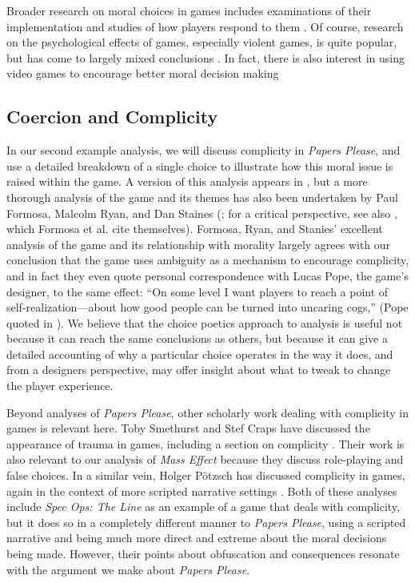\documentclass[arts,article,submit,moreauthors,pdftex,10pt,a4paper]{Definitions/mdpi}
\begin{document}
Broader research on moral choices in games includes examinations of their implementation and studies of how players respond to them \citep{svelch2010good,weaver2012mirrored,consalvo2016playing}.
%
Of course, research on the psychological effects of games, especially violent games, is quite popular, but has come to largely mixed conclusions \citep{ferguson2008school,ellithorpe2015moral}.
%
In fact, there is also interest in using video games to encourage better moral decision making \citep{kastarov2017training}

\subsection{Coercion and Complicity}

In our second example analysis, we will discuss complicity in \emph{Papers Please}, and use a detailed breakdown of a single choice to illustrate how this moral issue is raised within the game.
%
A version of this analysis appears in \citep{mawhorter2016artificial}, but a more thorough analysis of the game and its themes has also been undertaken by 
Paul Formosa, Malcolm Ryan, and Dan Staines (\citeyear{formosa2016papers}; for a critical perspective, see also \cite{alexander2013designing}, which Formosa et al. cite themselves).
%
Formosa, Ryan, and Stanies' excellent analysis of the game and its relationship with morality largely agrees with our conclusion that the game uses ambiguity as a mechanism to encourage complicity, and in fact they even quote personal correspondence with Lucas Pope, the game's designer, to the same effect: ``On some level I want players to reach a point of self-realization---about how good people can be turned into uncaring cogs,'' (Pope quoted in \cite{formosa2016papers}).
%
We believe that the choice poetics approach to analysis is useful not because it can reach the same conclusions as others, but because it can give a detailed accounting of why a particular choice operates in the way it does, and from a designers perspective, may offer insight about what to tweak to change the player experience.


Beyond analyses of \emph{Papers Please}, other scholarly work dealing with complicity in games is relevant here.
%
Toby Smethurst and Stef Craps have discussed the appearance of trauma in games, including a section on complicity \citep{smethurst2015playing}.
%
Their work is also relevant to our analysis of \emph{Mass Effect} because they discuss role-playing and false choices.
%
In a similar vein, Holger Pötzsch has discussed complicity in games, again in the context of more scripted narrative settings \citep{potzsch2017selective}.
%
Both of these analyses include \emph{Spec Ops: The Line} \citep{yager2012spec} as an example of a game that deals with complicity, but it does so in a completely different manner to \emph{Papers Please}, using a scripted narrative and being much more direct and extreme about the moral decisions being made.
%
However, their points about obfuscation and consequences resonate with the argument we make about \emph{Papers Please}.
\end{document}
